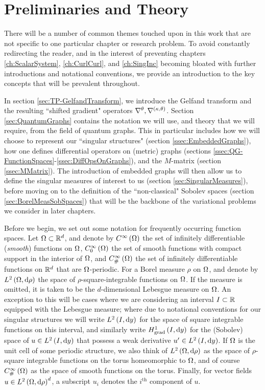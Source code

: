 \chapter{Preliminaries and Theory} \label{ch:TheoryPrelims}
There will be a number of common themes touched upon in this work that are not specific to one particular chapter or research problem.
To avoid constantly redirecting the reader, and in the interest of preventing chapters \ref{ch:ScalarSystem}, \ref{ch:CurlCurl}, and \ref{ch:SingInc} becoming bloated with further introductions and notational conventions, we provide an introduction to the key concepts that will be prevalent throughout.

In section \ref{sec:TP-GelfandTransform}, we introduce the Gelfand transform and the resulting ``shifted gradient" operators $\nabla^{\theta}, \nabla^{\left( \kappa, \theta \right)}$.
Section \ref{sec:QuantumGraphs} contains the notation we will use, and theory that we will require, from the field of quantum graphs.
This in particular includes how we will choose to represent our ``singular structures" (section \ref{ssec:EmbeddedGraphs}), how one defines differential operators on (metric) graphs (sections \ref{ssec:QG-FunctionSpaces}-\ref{ssec:DiffOpsOnGraphs}), and the $M$-matrix (section \ref{ssec:MMatrix}).
The introduction of embedded graphs will then allow us to define the singular measures of interest to us (section \ref{sec:SingularMeasures}), before moving on to the definition of the ``non-classical" Sobolev spaces (section \ref{sec:BorelMeasSobSpaces}) that will be the backbone of the variational problems we consider in later chapters.

Before we begin, we set out some notation for frequently occurring function spaces.
Let $\Omega\subset\mathbb{R}^d$, and denote by $C^{\infty}\left( \Omega \right)$ the set of infinitely differentiable (\emph{smooth}) functions on $\Omega$, $C^{\infty}_{0}\left( \Omega \right)$ the set of smooth functions with compact support in the interior of $\Omega$, and $C^{\infty}_{\#}\left( \Omega \right)$ the set of infinitely differentiable functions on $\mathbb{R}^d$ that are $\Omega$-periodic.
For a Borel measure $\rho$ on $\Omega$, and denote by $L^{2}\left( \Omega,\mathrm{d} \rho \right)$ the space of $\rho$-square-integrable functions on $\Omega$.
If the measure is omitted, it is taken to be the $d$-dimensional Lebesgue measure on $\Omega$.
An exception to this will be cases where we are considering an interval $I\subset\mathbb{R}$ equipped with the Lebesgue measure; where due to notational conventions for our singular structures we will write $L^{2}\left( I,\mathrm{d} y \right)$ for the space of square integrable functions on this interval, and similarly write $H^1_\mathrm{grad}\left( I, \mathrm{d}y \right)$ for the (Sobolev) space of $u\in L^{2}\left( I,\mathrm{d} y \right)$ that possess a weak derivative $u'\in L^{2}\left( I,\mathrm{d} y \right)$.
If $\Omega$ is the unit cell of some periodic structure, we also think of $L^{2}\left( \Omega,\mathrm{d} \rho \right)$ as the space of $\rho$-square integrable functions on the torus homeomorphic to $\Omega$, and of course $C^{\infty}_{\#}\left( \Omega \right)$ as the space of smooth functions on the torus.
Finally, for vector fields $u\in L^{2}\left( \Omega,\mathrm{d} \rho \right)^d$, a subscript $u_i$ denotes the $i^{\text{th}}$ component of $u$.









